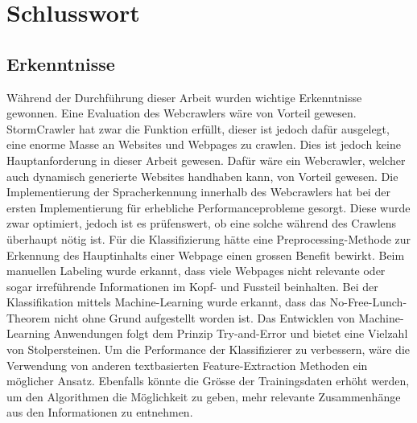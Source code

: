 \chapter{Schlusswort}
\section{Erkenntnisse}
Während der Durchführung dieser Arbeit wurden wichtige Erkenntnisse gewonnen.
Eine Evaluation des Webcrawlers wäre von Vorteil gewesen.
StormCrawler hat zwar die Funktion erfüllt, dieser ist jedoch dafür ausgelegt, eine enorme Masse an Websites und Webpages zu crawlen.
Dies ist jedoch keine Hauptanforderung in dieser Arbeit gewesen.
Dafür wäre ein Webcrawler, welcher auch dynamisch generierte Websites handhaben kann, von Vorteil gewesen.
Die Implementierung der Spracherkennung innerhalb des Webcrawlers hat bei der ersten Implementierung für erhebliche Performanceprobleme gesorgt.
Diese wurde zwar optimiert, jedoch ist es prüfenswert, ob eine solche während des Crawlens überhaupt nötig ist.
Für die Klassifizierung hätte eine Preprocessing-Methode zur Erkennung des Hauptinhalts einer Webpage einen grossen Benefit bewirkt.
Beim manuellen Labeling wurde erkannt, dass viele Webpages nicht relevante oder sogar irreführende Informationen im Kopf- und Fussteil beinhalten.
Bei der Klassifikation mittels Machine-Learning wurde erkannt, dass das \glqq No-Free-Lunch\grqq{}-Theorem nicht ohne Grund aufgestellt worden ist.
Das Entwicklen von Machine-Learning Anwendungen folgt dem Prinzip \glqq Try-and-Error\grqq{} und bietet eine Vielzahl von Stolpersteinen.
Um die Performance der Klassifizierer zu verbessern, wäre die Verwendung von anderen textbasierten Feature-Extraction Methoden ein möglicher Ansatz.
Ebenfalls könnte die Grösse der Trainingsdaten erhöht werden, um den Algorithmen die Möglichkeit zu geben, mehr relevante Zusammenhänge aus den Informationen zu entnehmen.
